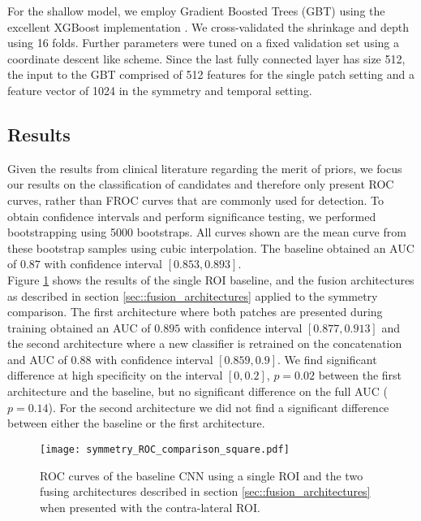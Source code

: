 \documentclass[12pt]{spieman}  %
\begin{document}
For the shallow model, we employ Gradient Boosted Trees (GBT) \cite{Frie01} using the excellent XGBoost implementation \cite{Chen16d}. We cross-validated the shrinkage and depth using 16 folds. Further parameters were tuned on a fixed validation set using a coordinate descent like scheme. Since the last fully connected layer has size 512, the input to the GBT comprised of 512 features for the single patch setting and a feature vector of 1024 in the symmetry and temporal setting.

\subsection{Results}
Given the results from clinical literature regarding the merit of priors, we focus our results on the classification of candidates and therefore only present ROC curves, rather than FROC curves that are commonly used for detection. To obtain confidence intervals and perform significance testing, we performed bootstrapping \cite{Efro94} using 5000 bootstraps. All curves shown are the mean curve from these bootstrap samples using cubic interpolation. The baseline obtained an AUC of $0.87$ with confidence interval $[0.853, 0.893]$. \\

Figure \ref{fig::symmetry_comparison} shows the results of the single ROI baseline, and the fusion architectures as described in section \ref{sec::fusion_architectures} applied to the symmetry comparison. The first architecture where both patches are presented during training obtained an AUC of $0.895$ with confidence interval $[0.877, 0.913]$ and the second architecture where a new classifier is retrained on the concatenation and AUC of $0.88$ with confidence interval $[0.859, 0.9]$. We find significant difference at high specificity on the interval $[0, 0.2]$, $p = 0.02$ between the first architecture and the baseline, but no significant difference on the full AUC ($p = 0.14$). For the second architecture we did not find a significant difference between either the baseline or the first architecture. 

\begin{figure}
 \centering
 \texttt{[image: symmetry\_ROC\_comparison\_square.pdf]}
 \caption{ROC curves of the baseline CNN using a single ROI and the two fusing architectures described in section \ref{sec::fusion_architectures} when presented with the contra-lateral ROI.}
 \label{fig::symmetry_comparison}
\end{figure}
\end{document}
